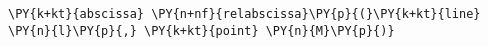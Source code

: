 \begin{Verbatim}[commandchars=\\\{\}]
      \PY{k+kt}{abscissa} \PY{n+nf}{relabscissa}\PY{p}{(}\PY{k+kt}{line} \PY{n}{l}\PY{p}{,} \PY{k+kt}{point} \PY{n}{M}\PY{p}{)}
\end{Verbatim}
